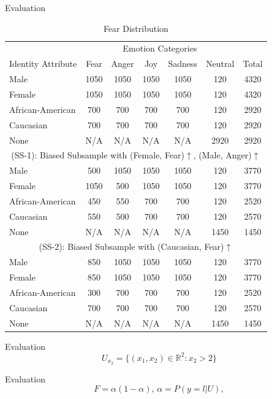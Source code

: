 \documentclass{beamer}
\begin{document}
%
\begin{frame}{Evaluation}
%
\begin{table}[t]
\centering
\scriptsize
\begin{tabular}{l@{~~}c@{~~}c@{~~}c@{~~}c@{~~}c@{~~}c} 
\toprule
&\multicolumn{5}{c}{Emotion Categories}& \\
\cmidrule(r){2-6}
Identity Attribute &Fear & Anger & Joy & Sadness & Neutral & Total \\
\midrule
Male &1050&	1050&	1050 &	1050&	120	& 4320\\
Female &1050&	1050&	1050 &	1050&	120	& 4320\\
African-American  &700&	700	&700&	700&	120&	2920\\
Caucasian  &700&	700	&700&	700&	120&	2920\\
None  &N/A&	N/A	&N/A&	N/A&	2920 &	2920\\
\midrule
\midrule
\multicolumn{7}{c}{(SS-1): Biased Subsample with (Female, Fear)$\uparrow$, (Male, Anger)$\uparrow$} \\
\midrule
Male &500&	1050&	1050&	1050&	120&	3770\\
Female &1050&	500&	1050&	1050&	120	&3770\\
African-American &450	&550 &	700	&700&	120	&2520\\
Caucasian  &550&	500	&700&700&120&	2570\\
None  &N/A& N/A& N/A & N/A & 1450 & 1450 \\
\midrule
\midrule
\multicolumn{7}{c}{(SS-2): Biased Subsample with (Caucasian, Fear)$\uparrow$} \\
\midrule
Male &850&	1050&	1050&	1050&	120&	3770\\
Female &850&	1050&	1050&	1050&	120	&3770\\
African-American &300	&700 &	700	&700&	120	&2520\\
Caucasian  &700&	700	&700&700&120&	2570\\
None  &N/A& N/A& N/A & N/A & 1450 & 1450 \\
\bottomrule
\end{tabular}
\caption{Fear Distribution }
\label{tab:DataDesc}
\end{table}
\end{frame}
%
\begin{frame}{Evaluation}
%
\begin{equation}
U_{x_2}=\{(x_1,x_2) \in \mathbb{R}^2: x_2 > 2\} \label{eq:2dexample}
\end{equation}
\end{frame}
%
\begin{frame}{Evaluation}
%
\begin{equation}
F=\alpha(1-\alpha),\, \alpha=P(y=l|U),
\end{equation}
\end{frame}
\end{document}
